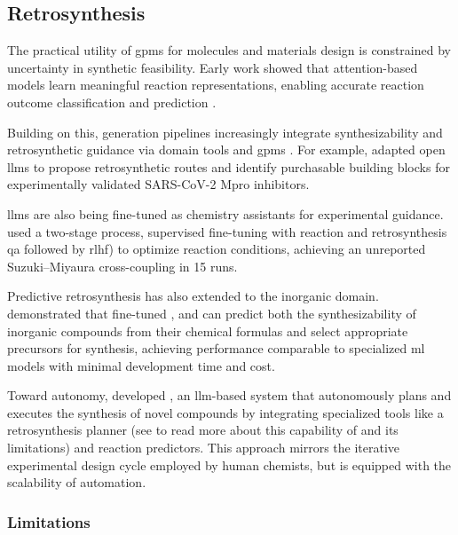  
\subsection{Retrosynthesis}\label{sec:retrosynthesis}

The practical utility of \glspl{gpm} for molecules and materials design is constrained by uncertainty in synthetic feasibility. 
Early work showed that attention-based models learn meaningful reaction representations, enabling accurate reaction outcome classification and prediction \autocite{schwaller2021mapping}.

Building on this, generation pipelines increasingly integrate synthesizability and retrosynthetic guidance via domain tools and \glspl{gpm} \autocite{liu2024multimodal}. 
For example, \textcite{sun2025synllama} adapted open \glspl{llm} to propose retrosynthetic routes and identify purchasable building blocks for experimentally validated SARS-CoV-2 Mpro inhibitors.

\glspl{llm} are also being fine-tuned as chemistry assistants for experimental guidance.
\textcite{zhang2025large} used a two-stage process, supervised fine-tuning with reaction and retrosynthesis \gls{qa} followed by \gls{rlhf}) to optimize reaction conditions, achieving an unreported Suzuki–Miyaura cross-coupling in 15 runs.

Predictive retrosynthesis has also extended to the inorganic domain. \textcite{kim2024large} demonstrated that fine-tuned , and  can predict both the synthesizability of inorganic compounds from their chemical formulas and select appropriate precursors for synthesis, achieving performance comparable to specialized \gls{ml} models with minimal development time and cost. 

Toward autonomy, \textcite{bran2024augmenting} developed , an \gls{llm}-based system that autonomously plans and executes the synthesis of novel compounds by integrating specialized tools like a retrosynthesis planner (see  to read more about this capability of  and its limitations) and reaction predictors. 
This approach mirrors the iterative experimental design cycle employed by human chemists, but is equipped with the scalability of automation. 

\subsubsection{Limitations}

